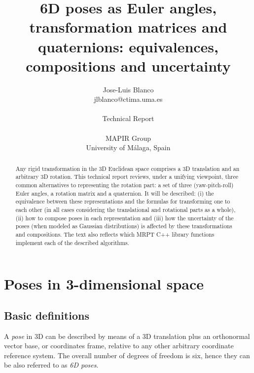 \documentclass[a4paper,10pt]{report}
\title{6D poses as Euler angles, transformation matrices and quaternions: equivalences, compositions and uncertainty}
\author{Jose-Luis Blanco\\jlblanco@ctima.uma.es\\~\\Technical Report\\~\\
MAPIR Group\\University of M\'alaga, Spain}
\begin{document}
\lstset{language=C++}
\lstset{basicstyle=\ttfamily\scriptsize} %


\maketitle

\pagestyle{plain}

\begin{abstract}
Any rigid transformation in the 3D Euclidean space 
comprises a 3D translation and an arbitrary 3D rotation.
This technical report reviews, under a unifying viewpoint, three common alternatives to representing the 
rotation part: a set of three (yaw-pitch-roll) Euler angles, a rotation matrix and a quaternion.
It will be described: 
(i) the equivalence between these representations and the formulas for transforming one to each other
(in all cases considering the translational and rotational parts as a whole),
(ii) how to compose poses in each representation and 
(iii) how the uncertainty of the poses (when modeled as Gaussian distributions)
is affected by these transformations and compositions.
The text also reflects which MRPT C++ library functions implement
each of the described algorithms.
\end{abstract}

\tableofcontents


\chapter{Poses in 3-dimensional space}


\section{Basic definitions}
\label{sect:basic}

A \emph{pose} in 3D can be described by means of a 3D translation plus an orthonormal vector base, 
or coordinates frame, relative to any other arbitrary coordinate reference system. 
The overall number of degrees of freedom is six, hence they can be also referred 
to as \emph{6D poses}.
\end{document}

